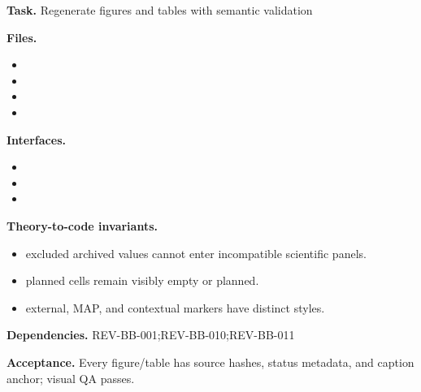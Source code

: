 \begin{statusbox}[CODE-BB-015]
\textbf{Task.} Regenerate figures and tables with semantic validation\par
\textbf{Files.}
\begin{itemize}[leftmargin=1.7em,itemsep=1.5pt,topsep=2pt]
\item {}
\item {}
\item {}
\item {}
\end{itemize}
\textbf{Interfaces.}
\begin{itemize}[leftmargin=1.7em,itemsep=1.5pt,topsep=2pt]
\item {}
\item {}
\item {}
\end{itemize}
\textbf{Theory-to-code invariants.}
\begin{itemize}[leftmargin=1.7em,itemsep=1.5pt,topsep=2pt]
\item excluded archived values cannot enter incompatible scientific panels.
\item planned cells remain visibly empty or planned.
\item external, MAP, and contextual markers have distinct styles.
\end{itemize}
\textbf{Dependencies.} REV-BB-001;REV-BB-010;REV-BB-011\par
\textbf{Acceptance.} Every figure/table has source hashes, status metadata, and caption anchor; visual QA passes.
\end{statusbox}

